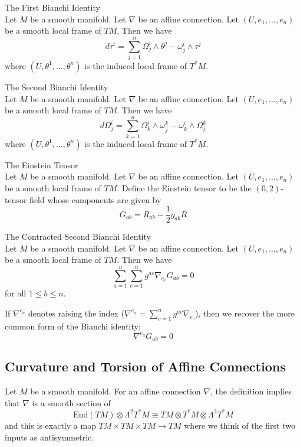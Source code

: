 \documentclass[a4paper]{article}
\begin{document}
\begin{thm}{The First Bianchi Identity}{}\\
Let $M$ be a smooth manifold. Let $\nabla$ be an affine connection. Let $(U,e_1,\dots,e_n)$ be a smooth local frame of $TM$. Then we have $$d\tau^i=\sum_{j=1}^n\Omega_j^i\wedge\theta^j-\omega_j^i\wedge\tau^j$$ where $(U,\theta^1,\dots,\theta^n)$ is the induced local frame of $T^\ast M$. 
\end{thm}

\begin{thm}{The Second Bianchi Identity}{}\\
Let $M$ be a smooth manifold. Let $\nabla$ be an affine connection. Let $(U,e_1,\dots,e_n)$ be a smooth local frame of $TM$. Then we have $$d\Omega_j^i=\sum_{k=1}^n\Omega_k^i\wedge\omega_j^k-\omega_k^i\wedge\Omega_j^k$$ where $(U,\theta^1,\dots,\theta^n)$ is the induced local frame of $T^\ast M$. 
\end{thm}

\begin{defn}{The Einstein Tensor}{}\\
Let $M$ be a smooth manifold. Let $\nabla$ be an affine connection. Let $(U,e_1,\dots,e_n)$ be a smooth local frame of $TM$. Define the Einstein tensor to be the $(0,2)$-tensor field whose components are given by $$G_{ab}=R_{ab}-\frac{1}{2}g_{ab}R$$
\end{defn}

\begin{thm}{The Contracted Second Bianchi Identity}{}\\
Let $M$ be a smooth manifold. Let $\nabla$ be an affine connection. Let $(U,e_1,\dots,e_n)$ be a smooth local frame of $TM$. Then we have $$\sum_{a=1}^n\sum_{c=1}^ng^{ac}\nabla_{e_c}G_{ab}=0$$ for all $1\leq b\leq n$. 
\end{thm}

If $\nabla^{e_a}$ denotes raising the index ($\nabla^{e_a}=\sum_{c=1}^ng^{ac}\nabla_{e_c}$), then we recover the more common form of the Bianchi identity: $$\nabla^{e_a}G_{ab}=0$$

\subsection{Curvature and Torsion of Affine Connections}
Let $M$ be a smooth manifold. For an affine connection $\nabla$, the definition implies that $\nabla$ is a smooth section of $$\text{End}(TM)\otimes\Lambda^2 T^\ast M\cong TM\otimes T^\ast M\otimes\Lambda^2 T^\ast M$$ and this is exactly a map $TM\times TM\times TM\to TM$ where we think of the first two inputs as antisymmetric. 
\end{document}
